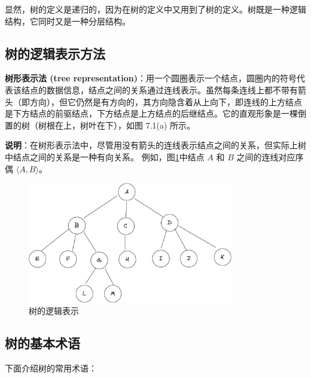 \documentclass[lang=cn,newtx,10pt,scheme=chinese]{elegantbook}
\begin{document}
显然，树的定义是递归的，因为在树的定义中又用到了树的定义。树既是一种逻辑结构，它同时又是一种分层结构。
\subsection{树的逻辑表示方法}

\textbf{树形表示法 (tree representation)}：用一个圆圈表示一个结点，圆圈内的符号代表该结点的数据信息，结点之间的关系通过连线表示。虽然每条连线上都不带有箭头（即方向），但它仍然是有方向的，其方向隐含着从上向下，即连线的上方结点是下方结点的前驱结点，下方结点是上方结点的后继结点。它的直观形象是一棵倒置的树（树根在上，树叶在下），如图 7.1(a) 所示。

\textbf{说明}：在树形表示法中，尽管用没有箭头的连线表示结点之间的关系，但实际上树中结点之间的关系是一种有向关系。
例如，图\ref{fig:tree}中结点 $A$ 和 $B$ 之间的连线对应序偶 $\langle A, B \rangle$。

\begin{figure}[h]
  \centering
  \includegraphics[width=0.8\textwidth]{./figure/pdf/cropped/tree.pdf}
  \caption{树的逻辑表示}
  \label{fig:tree}
\end{figure}
\subsection{树的基本术语}
下面介绍树的常用术语：
\end{document}

